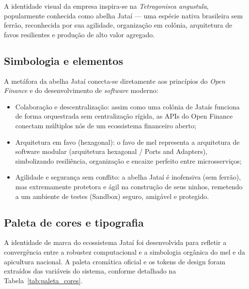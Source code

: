\documentclass[
  12pt,
  openright,
  oneside,
  a4paper,
  brazilian
]{abntex2}
\begin{document}
A identidade visual da empresa inspira-se na \textit{Tetragonisca angustula}, popularmente conhecida como abelha Jataí — uma espécie nativa brasileira sem ferrão, reconhecida por sua agilidade, organização em colônia, arquitetura de favos resilientes e produção de alto valor agregado.

\subsection{Simbologia e elementos}
A metáfora da abelha Jataí conecta-se diretamente aos princípios do \textit{Open Finance} e do desenvolvimento de \textit{software} moderno:
\begin{itemize}
    \item{Colaboração e descentralização:} assim como uma colônia de Jataís funciona de forma orquestrada sem centralização rígida, as APIs do Open Finance conectam múltiplos nós de um ecossistema financeiro aberto;
    \item{Arquitetura em favo (hexagonal):} o favo de mel representa a arquitetura de software modular (arquitetura hexagonal / Ports and Adapters), simbolizando resiliência, organização e encaixe perfeito entre microsserviços;
    \item{Agilidade e segurança sem conflito:} a abelha Jataí é inofensiva (sem ferrão), mas extremamente protetora e ágil na construção de seus ninhos, remetendo a um ambiente de testes (Sandbox) seguro, amigável e protegido.
\end{itemize}

\subsection{Paleta de cores e tipografia}
\label{sec:paleta_tipografia}

A identidade de marca do ecossistema Jataí foi desenvolvida para refletir a convergência entre a robustez computacional e a simbologia orgânica do mel e da apicultura nacional. A paleta cromática oficial e os tokens de design foram extraídos das variáveis do sistema, conforme detalhado na Tabela~\ref{tab:paleta_cores}.
\end{document}

